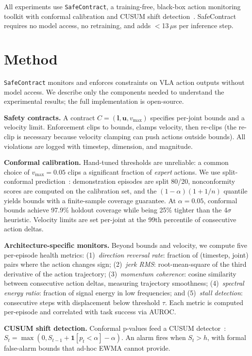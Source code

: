 \documentclass[conference]{IEEEtran}
\begin{document}
All experiments use \texttt{SafeContract}, a training-free, black-box action monitoring toolkit with conformal calibration and CUSUM shift detection~\cite{vovk2005,page1954}.
SafeContract requires no model access, no retraining, and adds $<$13\,$\mu$s per inference step.

\section{Method}
\label{sec:method}

\texttt{SafeContract} monitors and enforces constraints on VLA action outputs without model access.
We describe only the components needed to understand the experimental results; the full implementation is open-source.

\textbf{Safety contracts.}
A contract $C = (\mathbf{l}, \mathbf{u}, v_{\max})$ specifies per-joint bounds and a velocity limit.
Enforcement clips to bounds, clamps velocity, then re-clips (the re-clip is necessary because velocity clamping can push actions outside bounds).
All violations are logged with timestep, dimension, and magnitude.

\textbf{Conformal calibration.}
Hand-tuned thresholds are unreliable: a common choice of $v_{\max}{=}0.05$ clips a significant fraction of \emph{expert} actions.
We use split-conformal prediction~\cite{vovk2005}: demonstration episodes are split 80/20, nonconformity scores are computed on the calibration set, and the $(1{-}\alpha)(1 + 1/n)$ quantile yields bounds with a finite-sample coverage guarantee.
At $\alpha{=}0.05$, conformal bounds achieve 97.9\% holdout coverage while being 25\% tighter than the 4$\sigma$ heuristic.
Velocity limits are set per-joint at the 99th percentile of consecutive action deltas.

\textbf{Architecture-specific monitors.}
Beyond bounds and velocity, we compute five per-episode health metrics: (1)~\emph{direction reversal rate}: fraction of (timestep, joint) pairs where the action changes sign; (2)~\emph{jerk RMS}: root-mean-square of the third derivative of the action trajectory; (3)~\emph{momentum coherence}: cosine similarity between consecutive action deltas, measuring trajectory smoothness; (4)~\emph{spectral energy ratio}: fraction of signal energy in low frequencies; and (5)~\emph{stall detection}: consecutive steps with displacement below threshold $\tau$.
Each metric is computed per-episode and correlated with task success via AUROC.

\textbf{CUSUM shift detection.}
Conformal p-values feed a CUSUM detector~\cite{page1954}: $S_t = \max(0, S_{t-1} + \mathbf{1}[p_t < \alpha] - \alpha)$.
An alarm fires when $S_t > h$, with formal false-alarm bounds that ad-hoc EWMA cannot provide.
\end{document}
